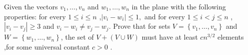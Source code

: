 Given the vectors $ v_ {1}, \dots, v_ {n} $ and $ w_ {1}, \dots, w_ {n} $ in the plane with the following properties:
for every $ 1 \leq i \leq n $ ,$ \left | v_{i} -w_{i} \right | \leq 1, $ and for every $ 1 \leq i <j \leq n $ ,$ \left | v_{i} -v_{j} \right | \ge 3 $ and $ v_{i} -w_ {i} \ne v_ {j} -w_ {j} $. Prove that for sets $ V = \left \{v_ {1}, \dots, v_{n } \right \} $ and $ W = \left \{w_ {1}, \dots, w_ {n} \right \}$, the set of $ V + (V \cup W) $ must have at least $ cn^{3/2} $ elements ,for some universal constant $ c>0 $ .